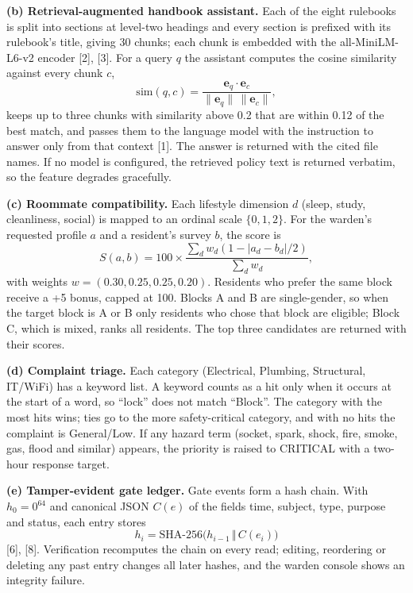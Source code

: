 \documentclass[12pt,a4paper,oneside]{report}
\begin{document}
\textbf{(b) Retrieval-augmented handbook assistant.} Each of the eight rulebooks is split into sections at level-two
headings and every section is prefixed with its rulebook's title, giving 30 chunks; each chunk is embedded with the
all-MiniLM-L6-v2 encoder [2], [3]. For a query $q$
the assistant computes the cosine similarity against every chunk $c$,
\begin{equation}
\mathrm{sim}(q, c) = \frac{\mathbf{e}_q \cdot \mathbf{e}_c}{\lVert \mathbf{e}_q \rVert\,\lVert \mathbf{e}_c \rVert},
\end{equation}
keeps up to three chunks with similarity above 0.2 that are within 0.12 of the best match, and passes them to
the language model with the instruction to answer only
from that context [1]. The answer is returned with the cited file names. If no model is configured, the retrieved
policy text is returned verbatim, so the feature degrades gracefully.

\textbf{(c) Roommate compatibility.} Each lifestyle dimension $d$ (sleep, study, cleanliness, social) is mapped to an
ordinal scale $\{0, 1, 2\}$. For the warden's requested profile $a$ and a resident's survey $b$, the score is
\begin{equation}
S(a, b) = 100 \times \frac{\sum_d w_d \left(1 - |a_d - b_d|/2\right)}{\sum_d w_d},
\end{equation}
with weights $w = (0.30, 0.25, 0.25, 0.20)$. Residents who prefer the same block receive a +5 bonus, capped at 100.
Blocks A and B are single-gender, so when the target block is A or B only residents who chose that block are eligible;
Block C, which is mixed, ranks all residents. The top three candidates are returned with their scores.

\textbf{(d) Complaint triage.} Each category (Electrical, Plumbing, Structural, IT/WiFi) has a keyword list. A keyword
counts as a hit only when it occurs at the start of a word, so ``lock'' does not match ``Block''. The category with the
most hits wins; ties go to the more safety-critical category, and with no hits the complaint is General/Low. If any
hazard term (socket, spark, shock, fire, smoke, gas, flood and similar) appears, the priority is raised to CRITICAL with
a two-hour response target.

\textbf{(e) Tamper-evident gate ledger.} Gate events form a hash chain. With $h_0 = 0^{64}$ and canonical JSON
$C(e)$ of the fields time, subject, type, purpose and status, each entry stores
\begin{equation}
h_i = \mathrm{SHA\text{-}256}\big(h_{i-1} \,\Vert\, C(e_i)\big)
\end{equation}
[6], [8]. Verification recomputes the chain on every read; editing, reordering or deleting any past entry changes all
later hashes, and the warden console shows an integrity failure.
\end{document}

